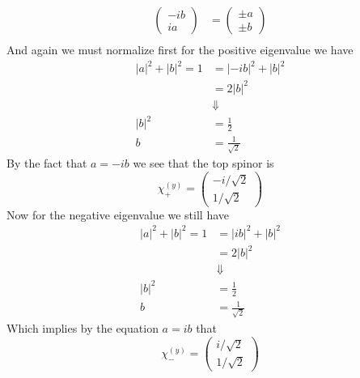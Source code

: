 \documentclass[11pt]{article}
\numberwithin{equation}{section}
\begin{document}
\begin{enumerate}[(a)]
\begin{align*}
\left(\begin{array}{c}-ib\\ ia\end{array}\right)
     &= \left(\begin{array}{c}\pm a\\ \pm b\end{array}\right)\\
\end{align*}
And again we must normalize first for the positive eigenvalue we have
\begin{align*}
|a|^2+|b|^2 = 1 &= |-ib|^2 + |b|^2\\
&=  2|b|^2\\
&\Downarrow\\
|b|^2 &= \frac{1}{2}\\
b &= \frac{1}{\sqrt{2}}
\end{align*}
By the fact that $a = -ib$ we see that the top spinor is
$$\chi^{(y)}_+ = \left(\begin{array}{c}
                   -i/\sqrt{2}\\
                    1/\sqrt{2}
                 \end{array}\right)$$
Now for the negative eigenvalue we still have
\begin{align*}
|a|^2+|b|^2 = 1 &= |ib|^2 + |b|^2\\
&=  2|b|^2\\
&\Downarrow\\
|b|^2 &= \frac{1}{2}\\
b &= \frac{1}{\sqrt{2}}
\end{align*}
Which implies by the equation $a = ib$ that
$$\chi^{(y)}_- = \left(\begin{array}{c}
                    i/\sqrt{2}\\
                    1/\sqrt{2}
                 \end{array}\right)$$


\end{enumerate}
\end{document}
